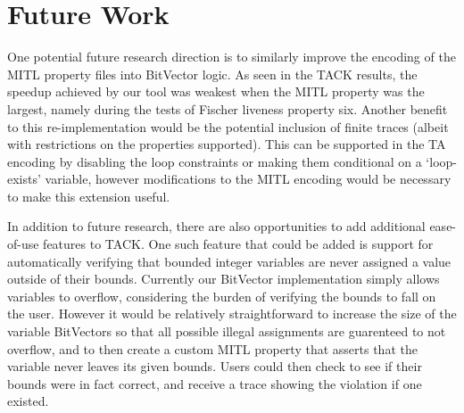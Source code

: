 \documentclass[a4paper,11pt]{report}
\theoremstyle{definition}
\begin{document}
\section{Future Work}

One potential future research direction is to similarly improve the encoding of
the MITL property files into BitVector logic. As seen in the TACK results, the
speedup achieved by our tool was weakest when the MITL property was the largest,
namely during the tests of Fischer liveness property six. Another benefit to
this re-implementation would be the potential inclusion of finite traces (albeit
with restrictions on the properties supported). This can be supported in the TA
encoding by disabling the loop constraints or making them conditional on a
`loop-exists' variable, however modifications to the MITL encoding would be
necessary to make this extension useful.

In addition to future research, there are also opportunities to add additional
ease-of-use features to TACK\@. One such feature that could be added is support
for automatically verifying that bounded integer variables are never assigned a
value outside of their bounds. Currently our BitVector implementation simply
allows variables to overflow, considering the burden of verifying the bounds to
fall on the user. However it would be relatively straightforward to increase the
size of the variable BitVectors so that all possible illegal assignments are
guarenteed to not overflow, and to then create a custom MITL property that
asserts that the variable never leaves its given bounds. Users could then check
to see if their bounds were in fact correct, and receive a trace showing the
violation if one existed.

\newpage



\end{document}
